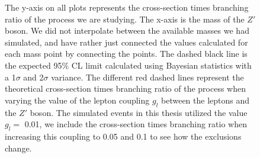 \documentclass[12pt, a4paper]{book}
\begin{document}
\begin{figure}[!ht]
{   The y-axis on all plots represents the cross-section times branching ratio of the process we are studying. The x-axis is the mass of the $Z'$ boson. We did not interpolate between the available masses we had simulated, 
   and have rather just connected the values calculated for each mass point by connecting the points. The dashed black line is the expected 95\% CL limit calculated using Bayesian statistics with a 1$\sigma$ and 2$\sigma$ variance. 
   The different red dashed lines represent the theoretical cross-section times branching ratio of the process when varying the value of the lepton coupling $g_l$ between the leptons and the $Z'$ boson. The simulated events in this thesis utilized the value $g_l=$ 0.01, we include the cross-section times branching ratio when increasing this coupling to 0.05 and 0.1 to see how the exclusions change. 
   }\label{fig:comp_HDS}
\end{figure}
\end{document}
